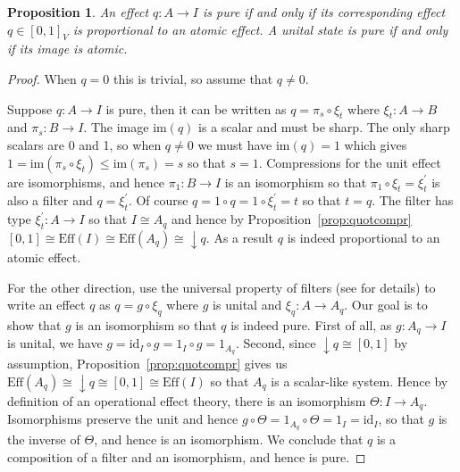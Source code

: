 \documentclass[a4paper,onecolumn,10pt,accepted=2019-05-03, issue=1, volume=1, shorttitle=papers/compositionality-1-1]{compositionalityarticle}
\newcounter{counter}
\numberwithin{counter}{section}
\newtheorem{proposition}[counter]{Proposition}
\newcommand{\pred}{\text{Eff}}
\newcommand{\id}{\text{id}}
\newcommand{\im}[1]{\text{im}(#1)}
\begin{document}
\begin{proposition} \label{prop:purestate}
	An effect $q:A\rightarrow I$ is pure if and only if its corresponding effect $q\in [0,1]_V$ is proportional to an atomic effect. A unital state is pure if and only if its image is atomic.
\end{proposition}
\begin{proof}
    When $q=0$ this is trivial, so assume that $q\neq 0$.

	Suppose $q:A\rightarrow I$ is pure, then it can be written as $q=\pi_s\circ \xi_t$ where $\xi_t: A\rightarrow B$ and $\pi_s:B\rightarrow I$. 
    The image $\im{q}$ is a scalar and must be sharp. The only sharp scalars are 0 and 1, so when $q\neq 0$ we must have $\im{q}=1$ which gives $1=\im{\pi_s\circ\xi_{t}}\leq \im{\pi_s} = s$ so that $s=1$. Compressions for the unit effect are isomorphisms, and hence $\pi_1:B\rightarrow I$ is an isomorphism so that $\pi_1\circ \xi_t = \xi_t^\prime$ is also a filter and $q=\xi_t^\prime$. 
    Of course $q=1\circ q = 1\circ \xi_t^\prime = t$ so that $t=q$. 
    The filter has type $\xi_t^\prime:A\rightarrow I$ so that $I\cong A_q$ and hence by Proposition~\ref{prop:quotcompr} $[0,1]\cong \pred(I) \cong \pred(A_q) \cong \downarrow q$. As a result $q$ is indeed proportional to an atomic effect. 
    
    For the other direction, use the universal property of filters (see \cite[197VII]{basthesis} for details) to write an effect $q$ as $q=g\circ\xi_{q}$ where $g$ is unital and $\xi_{q}:A\rightarrow A_q$. Our goal is to show that $g$ is an isomorphism so that $q$ is indeed pure. First of all, as $g:A_q\rightarrow I$ is unital, we have $g = \id_I\circ g = 1_I\circ g = 1_{A_q}$. Second, since $\downarrow q \cong [0,1]$ by assumption, Proposition~\ref{prop:quotcompr} gives us $\pred(A_q)\cong \downarrow q \cong [0,1] \cong \pred(I)$ so that $A_q$ is a scalar-like system. Hence by definition of an operational effect theory, there is an isomorphism $\Theta:I\rightarrow A_q$. Isomorphisms preserve the unit and hence $g\circ\Theta = 1_{A_q}\circ\Theta = 1_I = \id_I$, so that $g$ is the inverse of $\Theta$, and hence is an isomorphism. We conclude that $q$ is a composition of a filter and an isomorphism, and hence is pure.
    


\end{proof}
\end{document}

